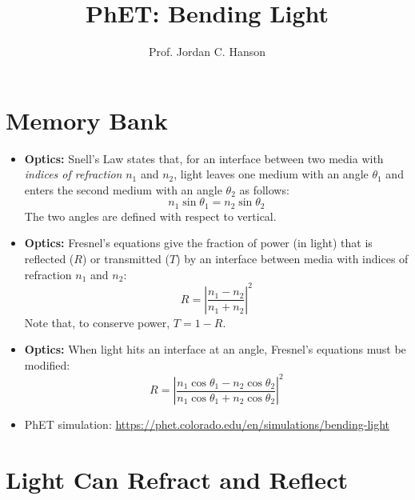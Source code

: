\documentclass{article}
\begin{document}
\twocolumn

\title{PhET: Bending Light}
\author{Prof. Jordan C. Hanson}

\maketitle

\section{Memory Bank}

\begin{itemize}
\item \textbf{Optics:} Snell's Law states that, for an interface between two media with \textit{indices of refraction} $n_1$ and $n_2$, light leaves one medium with an angle $\theta_1$ and enters the second medium with an angle $\theta_2$ as follows:
\begin{equation}
n_1 \sin\theta_1 = n_2\sin\theta_2 \label{eq:1}
\end{equation}
\noindent The two angles are defined with respect to vertical.
\item \textbf{Optics:} Fresnel's equations give the fraction of power (in light) that is reflected ($R$) or transmitted ($T$) by an interface between media with indices of refraction $n_1$ and $n_2$:
\begin{equation}
R = \left| \frac{n_1 - n_2}{n_1 + n_2} \right|^2 \label{eq:2}
\end{equation}
\noindent Note that, to conserve power, $T = 1 - R$.
\item \textbf{Optics:} When light hits an interface at an angle, Fresnel's equations must be modified:
\begin{equation}
R = \left| \frac{n_1\cos\theta_1 - n_2\cos\theta_2}{n_1\cos\theta_1 + n_2\cos\theta_2} \right|^2 \label{eq:3}
\end{equation}
\item PhET simulation: \url{https://phet.colorado.edu/en/simulations/bending-light}
\end{itemize}

\section{Light Can Refract and Reflect}
\end{document}
